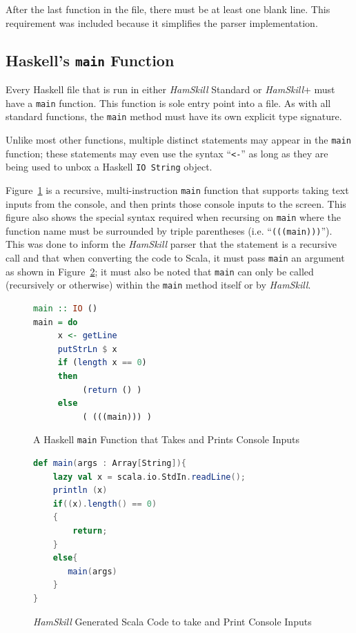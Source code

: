 \documentclass{report}
\begin{document}
After the last function in the file, there must be at least one blank line.  This requirement was included because it simplifies the parser implementation.

\subsection{Haskell's \texttt{main} Function}\label{sec:mainFunction}

Every Haskell file that is run in either \textit{HamSkill} Standard or \textit{HamSkill}+ must have a \texttt{main} function.  This function is sole entry point into a file.  As with all standard functions, the \texttt{main} method must have its own explicit type signature.

Unlike most other functions, multiple distinct statements may appear in the \texttt{main} function; these statements may even use the syntax ``\texttt{<-}'' as long as they are being used to unbox a Haskell \texttt{IO String} object.

Figure~\ref{fig:functionHaskellMainConsoleInput} is a recursive, multi-instruction \texttt{main} function that supports taking text inputs from the console, and then prints those console inputs to the screen.  This figure also shows the special syntax required when recursing on \texttt{main} where the function name must be surrounded by triple parentheses (i.e. ``\texttt{(((main)))}'').  This was done to inform the \textit{HamSkill} parser that the statement is a recursive call and that when converting the code to Scala, it must pass \texttt{main} an argument as shown in Figure~\ref{fig:functionScalaMainConsoleInput}; it must also be noted that \texttt{main} can only be called (recursively or otherwise) within the \texttt{main} method itself or by \textit{HamSkill}.

\begin{figure}[H]
\begin{mdframed}
\begin{lstlisting}[language=Haskell]
main :: IO ()
main = do 
     x <- getLine 
     putStrLn $ x
     if (length x == 0) 
     then 
          (return () )
     else
          ( (((main))) )
\end{lstlisting}
\end{mdframed}
\caption{A Haskell \texttt{main} Function that Takes and Prints Console Inputs}\label{fig:functionHaskellMainConsoleInput}
\end{figure}

\begin{figure}[H]
\begin{mdframed}
\begin{lstlisting}[language=scala]
def main(args : Array[String]){
    lazy val x = scala.io.StdIn.readLine();
    println (x)
    if((x).length() == 0)
    {
        return;
    }
    else{
       main(args)
    }
}
\end{lstlisting}
\end{mdframed}
\caption{\textit{HamSkill} Generated Scala Code to take and Print Console Inputs}\label{fig:functionScalaMainConsoleInput}
\end{figure}
\end{document}
